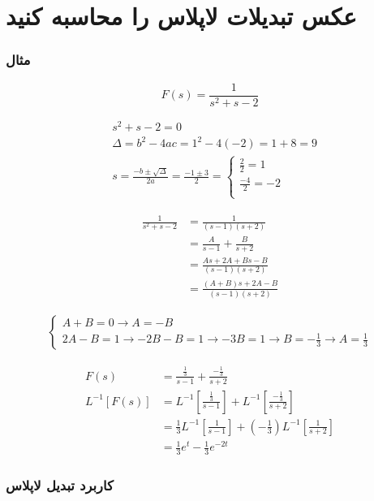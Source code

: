 \documentclass[12pt]{book}
\begin{document}
\section{عکس تبدیلات لاپلاس را محاسبه کنید}


\subsubsection{مثال}

$$
F(s) = \frac{1}{s^{2} + s - 2}
$$

\begin{align*}
&s^{2} + s - 2 = 0 \\
&\Delta = b^{2} - 4ac = 1^{2} - 4 ( -2 ) = 1 + 8 = 9 \\
&s = \frac{ -b \pm \sqrt{\Delta} }{2a} = \frac{-1 \pm 3}{2} = \begin{cases}
\frac{2}{2} = 1 \\
\frac{-4}{2} = -2 \\
\end{cases}
\end{align*}


\begin{align*}
\frac{1}{s^{2}+s-2} &= \frac{1}{(s-1)(s+2)} \\
&= \frac{A}{s-1} + \frac{B}{s+2} \\
&= \frac{As + 2A + Bs - B}{(s-1)(s+2)} \\
&= \frac{(A+B)s + 2A - B}{(s-1)(s+2)}
\end{align*}

\begin{align*}
\begin{cases}
A + B = 0 \to A = - B \\
2A - B = 1 \to -2B - B = 1 \to -3B = 1 \to B = - \frac{1}{3} \to A = \frac{1}{3}
\end{cases}
\end{align*}

\begin{align*}
F(s) &= \frac{\frac{1}{3}}{s - 1} + \frac{- \frac{1}{3}}{s+2} \\
L^{-1}\left[ F(s) \right] &= L^{-1}\left[ \frac{\frac{1}{3}}{s - 1} \right] + L^{-1}\left[ \frac{- \frac{1}{3}}{s+2} \right] \\
&= \frac{1}{3} L^{-1}\left[ \frac{1}{s-1} \right] + (- \frac{1}{3} ) L^{-1}\left[ \frac{1}{s+2} \right] \\
&= \frac{1}{3} e^{t} - \frac{1}{3} e^{-2t} 
\end{align*}


\subsubsection{کاربرد تبدیل لاپلاس}
\end{document}
